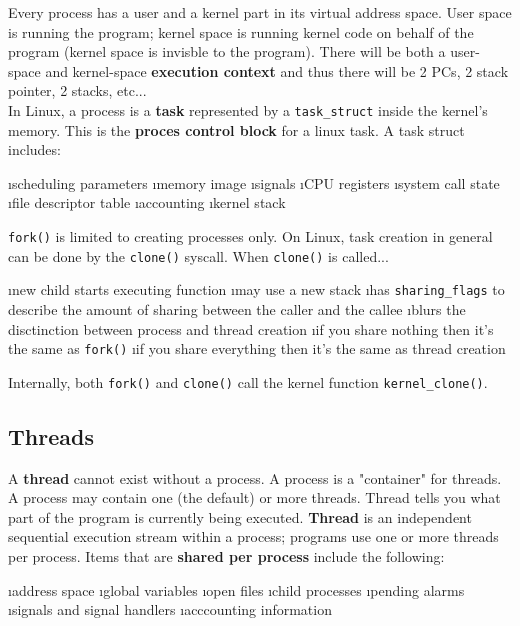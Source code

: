 \documentclass{article}
\begin{document}
    Every process has a user and a kernel part in its virtual address space. User space is running the program; kernel space is running kernel code on behalf of the program (kernel space is invisble to the program). There will be both a user-space and kernel-space \textbf{execution context} and thus there will be 2 PCs, 2 stack pointer, 2 stacks, etc... \\

    \noindent In Linux, a process is a \textbf{task} represented by a \texttt{task\_struct} inside the kernel's memory. This is the \textbf{proces control block} for a linux task. A task struct includes:

    \bl
    \i scheduling parameters
    \i memory image
    \i signals
    \i CPU registers
    \i system call state
    \i file descriptor table
    \i accounting
    \i kernel stack
    \el

    \noindent \texttt{fork()} is limited to creating processes only. On Linux, task creation in general can be done by the \texttt{clone()} syscall. When \texttt{clone()} is called... 

    \bl
    \i new child starts executing function
    \i may use a new stack
    \i has \texttt{sharing\_flags} to describe the amount of sharing between the caller and the callee
    \i blurs the disctinction between process and thread creation 
    \bl
    \i if you share nothing then it's the same as \texttt{fork()}
    \i if you share everything then it's the same as thread creation
    \el
    \el

    \noindent Internally, both \texttt{fork()} and \texttt{clone()} call the kernel function \texttt{kernel\_clone()}.

\subsection{Threads}

    A \textbf{thread} cannot exist without a process. A process is a "container" for threads. A process may contain one (the default) or more threads. Thread tells you what part of the program is currently being executed. \textbf{Thread} is an independent sequential execution stream within a process; programs use one or more threads per process. Items that are \textbf{shared per process} include the following:

    \bl
    \i address space
    \i global variables
    \i open files
    \i child processes
    \i pending alarms
    \i signals and signal handlers
    \i acccounting information
    \el
\end{document}
